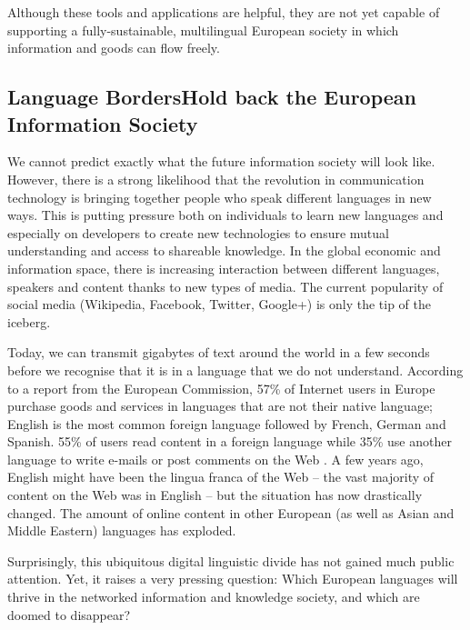 \documentclass[]{../../metanetpaper}
\begin{document}
\begin{multicols}{2}
Although these tools and applications are helpful, they are not yet capable of supporting a fully-sustainable, multilingual European society in which information and goods can flow freely.

\subsection[Language Borders Hold back the European Information Society]{Language Borders\newline Hold back the European Information Society}

We cannot predict exactly what the future information society will look like. However, there is a strong likelihood that the revolution in communication technology is bringing together people who speak different languages in new ways. This is putting pressure both on individuals to learn new languages and especially on developers to create new technologies to ensure mutual understanding and access to shareable knowledge. In the global economic and information space, there is increasing interaction between different languages, speakers and content thanks to new types of media. The current popularity of social media (Wikipedia, Facebook, Twitter, Google+) is only the tip of the iceberg.


Today, we can transmit gigabytes of text around the world in a few seconds before we recognise that it is in a language that we do not understand. According to a report from the European Commission, 57\% of Internet users in Europe purchase goods and services in languages that are not their native language; English is the most common foreign language followed by French, German and Spanish. 55\% of users read content in a foreign language while 35\% use another language to write e-mails or post comments on the Web \cite{EC1}. A few years ago, English might have been the lingua franca of the Web -- the vast majority of content on the Web was in English -- but the situation has now drastically changed. The amount of online content in other European (as well as Asian and Middle Eastern) languages has exploded.

Surprisingly, this ubiquitous digital linguistic divide has not gained much public attention. Yet, it raises a very pressing question: Which European languages will thrive in the networked information and knowledge society, and which are doomed to disappear?


\end{multicols}
\end{document}
